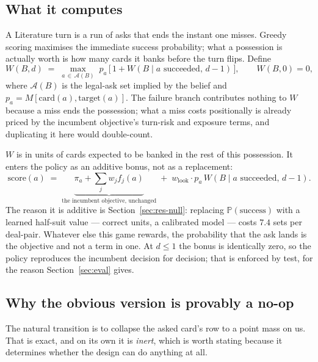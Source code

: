 \documentclass[11pt,a4paper]{article}
\newcommand{\Prob}{\ensuremath{\mathbb{P}}}
\begin{document}
\subsection{What it computes}

A Literature turn is a run of asks that ends the instant one misses. Greedy
scoring maximises the immediate success probability; what a possession is
actually worth is how many cards it banks before the turn flips. Define
\begin{equation}
W(B, d) \;=\; \max_{a \,\in\, \mathcal{A}(B)}\;
p_a \,\bigl[\, 1 + W(B \mid a \text{ succeeded},\, d-1) \,\bigr],
\qquad W(B, 0) = 0,
\label{eq:chain}
\end{equation}
where $\mathcal{A}(B)$ is the legal-ask set implied by the belief and
$p_a = M[\text{card}(a), \text{target}(a)]$. The failure branch contributes
nothing to $W$ because a miss ends the possession; what a miss costs
positionally is already priced by the incumbent objective's turn-risk and
exposure terms, and duplicating it here would double-count.

$W$ is in units of cards expected to be banked in the rest of this possession.
It enters the policy as an additive bonus, not as a replacement:
\begin{equation}
\text{score}(a) \;=\; \underbrace{\pi_a + \textstyle\sum_j w_j f_j(a)}
_{\text{the incumbent objective, unchanged}}
\;+\; w_{\mathrm{look}} \cdot p_a \, W(B \mid a \text{ succeeded},\, d-1).
\label{eq:lookscore}
\end{equation}
The reason it is additive is Section~\ref{sec:res-null}: replacing
$\Prob(\text{success})$ with a learned half-suit value --- correct units, a
calibrated model --- costs $7.4$ sets per deal-pair. Whatever else this game
rewards, the probability that the ask lands is the objective and not a term in
one. At $d \le 1$ the bonus is identically zero, so the policy reproduces the
incumbent decision for decision; that is enforced by test, for the reason
Section~\ref{sec:eval} gives.

\subsection{Why the obvious version is provably a no-op}

The natural transition is to collapse the asked card's row to a point mass on
us. That is exact, and on its own it is \emph{inert}, which is worth stating
because it determines whether the design can do anything at all.
\end{document}

